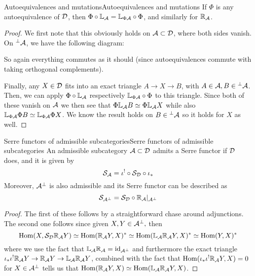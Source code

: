 \begin{corollary}{Autoequivalences and mutations}{Autoequivalences and mutations}
    If $\Phi$ is any autoequivalence of $\mathcal{D}$, then $\Phi \circ \mathbb{L}_{\mathcal{A}} = \mathbb{L}_{\Phi\mathcal{A}} \circ \Phi$, and similarly for $\mathbb{R}_{\mathcal{A}}$.
\end{corollary}
\begin{proof}
    We first note that this obviously holds on $\mathcal{A} \subset \mathcal{D}$, where both sides vanish. On $\prescript{\perp}{}{}\mathcal{A}$, we have the following diagram:
    \begin{center}
    \end{center}

    So again everything commutes as it should (since autoequivalences commute with taking orthogonal complements).

    Finally, any $X\in \mathcal{D}$ fits into an exact triangle $A\rightarrow X \rightarrow B$, with $A\in\mathcal{A}, B\in \prescript{\perp}{}{}\mathcal{A}$. Then, we can apply $\Phi \circ \mathbb{L}_{\mathcal{A}} $ respectively $\mathbb{L}_{\Phi\mathcal{A}} \circ \Phi$ to this triangle. Since both of these vanish on $\mathcal{A}$ we then see that $\Phi\mathbb{L}_{\mathcal{A}} B \simeq \Phi \mathbb{L}_{\mathcal{A}} X $ while also $\mathbb{L}_{\Phi\mathcal{A}} \Phi B \simeq \mathbb{L}_{\Phi\mathcal{A}} \Phi X$. We know the result holds on $B\in \prescript{\perp}{}{}\mathcal{A}$ so it holds for $X$ as well.

\end{proof}

\begin{lemma}{Serre functors of admissible subcategories}{Serre functors of admissible subcategories}
    An admissible subcategory $\mathcal{A}\subset \mathcal{D}$ admits a Serre functor if $\mathcal{D}$ does, and it is given by $$\mathcal{S}_{\mathcal{A}} = \iota^! \circ \mathcal{S}_{\mathcal{D}} \circ \iota_*$$
    Moreover, $\mathcal{A}^\perp$ is also admissible and its Serre functor can be described as $$\mathcal{S}_{\mathcal{A}^\perp}=\mathcal{S}_{\mathcal{D}} \circ \mathbb{R}_{\mathcal{A}}|_{\mathcal{A}^\perp}$$
  \end{lemma}
  \begin{proof}
      The first of these follows by a straightforward chase around adjunctions. The second one follows since given $X,Y \in \mathcal{A}^\perp,$ then $$\operatorname{Hom}(X, \mathcal{S}_{\mathcal{D}} \mathbb{R}_{\mathcal{A}} Y)\simeq \operatorname{Hom}(\mathbb{R}_{\mathcal{A}} Y, X)^*\simeq \operatorname{Hom}(\mathbb{L}_{\mathcal{A}} \mathbb{R}_{\mathcal{A}} Y, X)^*\simeq \operatorname{Hom}(Y,X)^*$$where we use the fact that $\mathbb{L}_{\mathcal{A}}\mathbb{R}_{\mathcal{A}}=\mathrm{id}_{\mathcal{A}^\perp}$ and furthermore the exact triangle $\iota_* \iota^! \mathbb{R}_{\mathcal{A}} Y \rightarrow \mathbb{R}_{\mathcal{A}} Y \rightarrow \mathbb{L}_{\mathcal{A}} \mathbb{R}_{\mathcal{A}} Y$, combined with the fact that $\operatorname{Hom}(\iota_* \iota^! \mathbb{R}_{\mathcal{A}} Y,X)=0$ for $X\in \mathcal{A}^\perp$ tells us that $\operatorname{Hom}(\mathbb{R}_{\mathcal{A}} Y, X)\simeq \operatorname{Hom}(\mathbb{L}_{\mathcal{A}} \mathbb{R}_{\mathcal{A}} Y, X)$.
 \end{proof}


